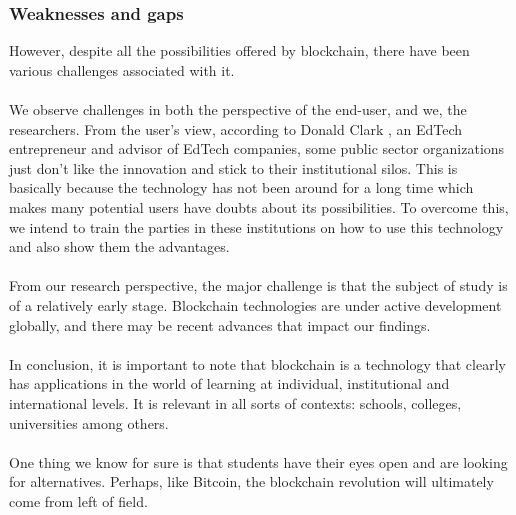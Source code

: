 \subsubsection{Weaknesses and gaps}

However, despite all the possibilities offered by blockchain, there have been various challenges associated with it.\\\\
We observe challenges in both the perspective of the end-user, and we, the researchers. From the user’s view, according to Donald Clark \cite{art11}, an EdTech entrepreneur and advisor of EdTech companies, some public sector organizations just don’t like the innovation and stick to their institutional silos. This is basically because the technology has not been around for a long time which makes many potential users have doubts about its possibilities. To overcome this, we intend to train the parties in these institutions on how to use this technology and also show them the advantages.\\\\
From our research perspective, the major challenge is that the subject of study is of a relatively early stage. Blockchain technologies are under active development globally, and there may be recent advances that impact our findings.\\\\
In conclusion, it is important to note that blockchain is a technology that clearly has applications in the world of learning at individual, institutional and international levels. It is relevant in all sorts of contexts: schools, colleges, universities among others.\\\\
One thing we know for sure is that students have their eyes open and are looking for alternatives. Perhaps, like Bitcoin, the blockchain revolution will ultimately come from left of field.
\newpage


